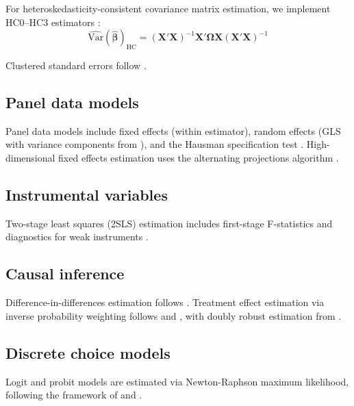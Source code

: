 \documentclass[article]{jss}
\begin{document}
For heteroskedasticity-consistent covariance matrix estimation, we implement
HC0--HC3 estimators \citep{White:1980, MacKinnon+White:1985, Zeileis:2004}:
\begin{equation}
  \widehat{\mathrm{Var}}(\hat{\bm{\beta}})_{\mathrm{HC}} =
    (\mathbf{X}'\mathbf{X})^{-1} \mathbf{X}'\bm{\Omega}\mathbf{X} (\mathbf{X}'\mathbf{X})^{-1}
\end{equation}

Clustered standard errors follow \cite{Cameron+Gelbach+Miller:2011}.

\subsection{Panel data models} \label{sec:panel}

Panel data models include fixed effects (within estimator), random effects
(GLS with variance components from \cite{Swamy+Arora:1972}), and the Hausman
specification test \citep{Hausman:1978}. High-dimensional fixed effects
estimation uses the alternating projections algorithm \citep{Guimaraes+Portugal:2010,
Gaure:2013, Correia:2017}.

\subsection{Instrumental variables} \label{sec:iv}

Two-stage least squares (2SLS) estimation includes first-stage F-statistics
and diagnostics for weak instruments \citep{Staiger+Stock:1997, Stock+Yogo:2005}.

\subsection{Causal inference} \label{sec:causal}

Difference-in-differences estimation follows \cite{Card+Krueger:1994}.
Treatment effect estimation via inverse probability weighting follows
\cite{Horvitz+Thompson:1952} and \cite{Robins+Rotnitzky+Zhao:1994}, with
doubly robust estimation from \cite{Bang+Robins:2005}.

\subsection{Discrete choice models} \label{sec:discrete}

Logit and probit models are estimated via Newton-Raphson maximum likelihood,
following the framework of \cite{McFadden:1974} and \cite{Train:2009}.
\end{document}
